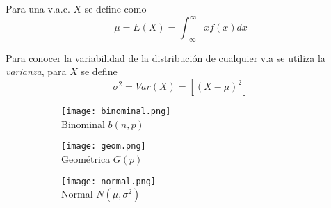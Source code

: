 Para una v.a.c. $X$ se define como
\begin{equation}
\mu=E(X)=\int_{-\infty}^{\infty}xf(x)dx
\end{equation}

Para conocer la variabilidad de la distribución de cualquier v.a se utiliza la \emph{varianza}, para $X$ se define
\begin{equation}
\sigma^2=Var(X)=[{(X-\mu)}^2]
\end{equation}

\begin{figure}[H]\centering\caption[Distribuciones]{Diversas de distribuciones pueden modelar v.a.s, a continuación se muestran las mas importantes de acuerdo a \citeauthor{bala20} (\citeyear{bala20}).}\label{FIG:DISTS}
\begin{subfigure}[t]{.3\textwidth}\texttt{[image: binominal.png]}\centering\\Binominal $b(n,p)$\end{subfigure}\quad
\begin{subfigure}[t]{.3\textwidth}\texttt{[image: geom.png]}\centering\\Geométrica $G(p)$\end{subfigure}\quad
\begin{subfigure}[t]{.3\textwidth}\texttt{[image: normal.png]}\centering\\Normal $N(\mu,\sigma^2)$\end{subfigure}
\end{figure}

